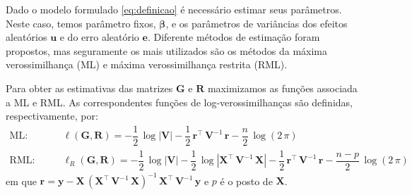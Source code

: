 \documentclass[12pt,a4paper,final]{article}
\begin{document}
Dado o modelo formulado \eqref{eq:definicao} é necessário estimar seus parâmetros. Neste caso, temos 
parâmetro fixos, $ \bm{\beta} $, e os parâmetros de variâncias dos efeitos aleatórios $\mathbf{u}$
e do erro aleatório $\mathbf{e}$. Diferente métodos de estimação foram propostos, mas seguramente os mais
utilizados são os métodos da máxima verossimilhança (ML) e máxima verossimilhança restrita (RML).

Para obter as estimativas das matrizes $ \mathbf{G} $ e $ \mathbf{R} $ maximizamos as funções associada a ML e RML. 
As correspondentes funções de log-verossimilhanças são definidas, respectivamente, por:
\begin{equation}\label{eq:loglik}
\begin{split}
\text{ML:}&\qquad 
\ell(\mathbf{G}, \mathbf{R}) = -\dfrac{1}{2}\,\log \left|\mathbf{V}\right| - 
\dfrac{1}{2}\,\mathbf{r}^\top\,\mathbf{V}^{-1}\,\mathbf{r} - \dfrac{n}{2}\,\log\left(2\,\pi\right)\\
\text{RML:}&\qquad 
\ell_R(\mathbf{G}, \mathbf{R}) = -\dfrac{1}{2}\,\log \left|\mathbf{V}\right| - 
\dfrac{1}{2}\,\log \left|\mathbf{X}^\top\,\mathbf{V}^{-1}\,\mathbf{X}\right| - 
\dfrac{1}{2}\,\mathbf{r}^\top\,\mathbf{V}^{-1}\,\mathbf{r} - \dfrac{n - p}{2}\,\log\left(2\,\pi\right)\nonumber
\end{split}
\end{equation}
em que $ \mathbf{r} = \mathbf{y} - \mathbf{X}\,\left(\mathbf{X}^\top\,\mathbf{V}^{-1}\,\mathbf{X}\right)^{-1}
\,\mathbf{X}^\top\,\mathbf{V}^{-1}\,\mathbf{y}$ e $ p $ é o posto de $ \mathbf{X} $.
\end{document}
